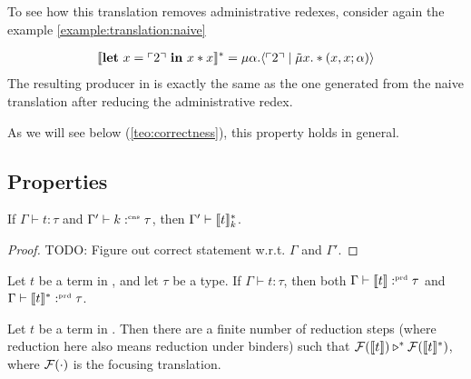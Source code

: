 To see how this translation removes administrative redexes, consider again the example \cref{example:translation:naive}
\begin{example}
  \begin{align*}
    \llbracket \mathbf{let}\ x = \ulcorner 2 \urcorner\ \mathbf{in}\ x*x \rrbracket^* = \mu\alpha.\langle \ulcorner 2 \urcorner \mid \tilde\mu x.*(x,x;\alpha) \rangle
  \end{align*}
  The resulting producer in \targetlang{} is exactly the same as the one generated from the naive translation after reducing the administrative redex.
\end{example}
As we will see below (\cref{teo:correctness}), this property holds in general.

\subsection{Properties}
\label{subsec:translation:properties}

\begin{lemma}
  If $\Gamma \vdash t : \tau$ and $\Gamma' \vdash k :^{\text{\tiny cns}} \tau$, then $\Gamma' \vdash \llbracket t \rrbracket_{k}^{\ast}$.
\end{lemma}
\begin{proof}
  TODO: Figure out correct statement w.r.t. $\Gamma$ and $\Gamma'$.
\end{proof}

\begin{theorem}
  Let $t$ be a term in \surfacelang, and let $\tau$ be a type.
  If $\Gamma \vdash t: \tau$, then both $\Gamma \vdash \llbracket t \rrbracket :^{\text{\tiny prd}} \tau$ and $\Gamma \vdash \llbracket t \rrbracket_{}^{\ast} :^{\text{\tiny prd}} \tau$.
\end{theorem}

\begin{theorem}[Correctness]
  \label{teo:correctness}
  Let $t$ be a term in \surfacelang. Then there are a finite number of reduction steps (where reduction here also means reduction under binders) such that $\mathcal{F}(\llbracket t \rrbracket) \triangleright^{\ast} \mathcal{F}(\llbracket t \rrbracket_{}^{\ast})$, where $\mathcal{F}(\cdot)$ is the focusing translation.
\end{theorem}
